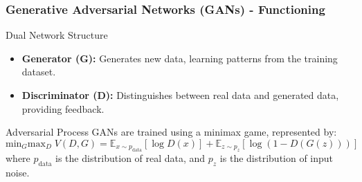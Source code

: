 \documentclass[aspectratio=169]{beamer}
\begin{document}
\begin{frame}[fragile]
    \frametitle{Generative Adversarial Networks (GANs) - Functioning}
    \begin{block}{Dual Network Structure}
        \begin{itemize}
            \item \textbf{Generator (G):} Generates new data, learning patterns from the training dataset.
            \item \textbf{Discriminator (D):} Distinguishes between real data and generated data, providing feedback.
        \end{itemize}
    \end{block}

    \begin{block}{Adversarial Process}
        GANs are trained using a minimax game, represented by:
        \begin{equation}
            \text{min}_G \text{max}_D \; V(D, G) = \mathbb{E}_{x \sim p_{\text{data}}} [\log D(x)] + \mathbb{E}_{z \sim p_z} [\log(1 - D(G(z)))]
        \end{equation}
        where $p_{\text{data}}$ is the distribution of real data, and $p_z$ is the distribution of input noise.
    \end{block}
\end{frame}
\end{document}
